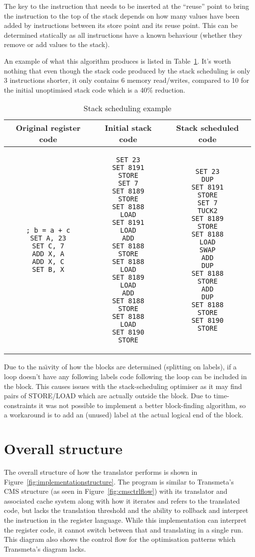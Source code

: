 The key to the instruction that needs to be inserted at the ``reuse'' point to
bring the instruction to the top of the stack depends on how many values have
been added by instructions between its store point and its reuse point. This can
be determined statically as all instructions have a known behaviour (whether
they remove or add values to the stack).

An example of what this algorithm produces is listed in
Table~\ref{tab:scheduleex}. It's worth nothing that even though the stack code
produced by the stack scheduling is only 3 instructions shorter, it only
contains 6 memory read/writes, compared to 10 for the initial unoptimised stack
code which is a 40\% reduction.

\begin{table}
\caption{Stack scheduling example}
\begin{tabular}{c c c}\label{tab:scheduleex}
  Original register code & Initial stack code & Stack scheduled code
  \\ \toprule
\begin{lstlisting}
; b = a + c
SET A, 23
SET C, 7
ADD X, A
ADD X, C
SET B, X
\end{lstlisting} &
\begin{lstlisting}
SET 23
SET 8191
STORE
SET 7
SET 8189
STORE
SET 8188
LOAD
SET 8191
LOAD
ADD
SET 8188
STORE
SET 8188
LOAD
SET 8189
LOAD
ADD
SET 8188
STORE
SET 8188
LOAD
SET 8190
STORE
\end{lstlisting} &
\begin{lstlisting}
SET 23
DUP
SET 8191
STORE
SET 7
TUCK2
SET 8189
STORE
SET 8188
LOAD
SWAP
ADD
DUP
SET 8188
STORE
ADD
DUP
SET 8188
STORE
SET 8190
STORE
\end{lstlisting} \\
\end{tabular}
\end{table}

Due to the na{\"\i}vity of how the blocks are determined (splitting on labels),
if a loop doesn't have any following labels code following the loop can be
included in the block. This causes issues with the stack-scheduling optimiser as
it may find pairs of STORE/LOAD which are actually outside the block. Due to
time-constraints it was not possible to implement a better block-finding
algorithm, so a workaround is to add an (unused) label at the actual logical end
of the block.

\section{Overall structure}
The overall structure of how the translator performs is shown in
Figure~\ref{fig:implementationstructure}. The program is similar to Transmeta's
CMS structure (as seen in Figure~\ref{fig:cmsctrlflow}) with its translator and
associated cache system along with how it iterates and refers to the translated
code, but lacks the translation threshold and the ability to rollback and
interpret the instruction in the register language. While this implementation
can interpret the register code, it cannot switch between that and translating
in a single run. This diagram also shows the control flow for the optimisation
patterns which Transmeta's diagram lacks.

